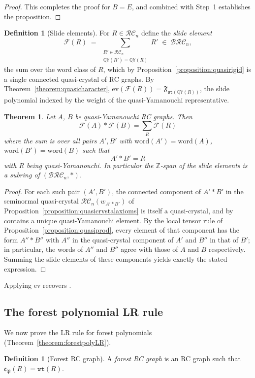 \documentclass{amsart}
\newtheorem{theorem}{Theorem}[section]
\theoremstyle{definition}
\newtheorem{definition}[lemma]{Definition}
\theoremstyle{remark}
\numberwithin{equation}{subsection}
\newcommand{\wof}[1]{w_{#1}}
\newcommand{\slel}{\mathcal{F}}
\newcommand{\wtt}{\mathtt{wt}}
\newcommand{\QY}{\ensuremath{\mathbb{QY}}}
\newcommand{\BRC}{\mathcal{BRC}}
\newcommand{\RC}{\mathcal{RC}}
\newcommand{\slide}{\mathfrak{F}}
\newcommand{\code}{\mathfrak{c}}
\newcommand{\forest}{\mathfrak{P}}
\begin{document}
\begin{proof}
This completes the proof for $B = E$, and combined with Step~1 establishes the proposition.
\end{proof}

\begin{definition}[Slide elements]\label{definition:slideelement}
For $R\in\RC_n$ define the \emph{slide element}
$$\slel(R)\;=\;\sum_{\substack{R'\in\RC_n\\ \QY(R')=\QY(R)}}R'\;\in\;\BRC_n,$$
the sum over the word class of $R$, which by Proposition~\ref{proposition:quasirigid} is a single connected quasi-crystal of RC graphs. By Theorem~\ref{theorem:quasicharacter}, $\mathrm{ev}(\slel(R))=\slide_{\wtt(\QY(R))}$, the slide polynomial indexed by the weight of the quasi-Yamanouchi representative.
\end{definition}

\begin{theorem} \label{theorem:slideproduct}
Let $A$, $B$ be quasi-Yamanouchi RC graphs. Then
$$\slel(A)*\slel(B) = \sum_{R} \slel(R)$$
where the sum is over all pairs $A',B'$ with $\mathrm{word}(A')=\mathrm{word}(A)$, $\mathrm{word}(B')=\mathrm{word}(B)$ such that 
$$A'*B'=R$$
with $R$ being quasi-Yamanouchi. In particular the $\mathbb{Z}$-span of the slide elements is a subring of $(\BRC_n,*)$.
\end{theorem}
\begin{proof}
For each such pair $(A',B')$, the connected component of $A'*B'$ in the seminormal quasi-crystal $\RC_n(\wof{A'*B'})$ of Proposition~\ref{proposition:quasicrystalaxioms} is itself a quasi-crystal, and by \cite[Proposition~4.6]{cain2023quasicrystals} contains a unique quasi-Yamanouchi element. By the local tensor rule of Proposition~\ref{proposition:quasiprod}, every element of that component has the form $A''*B''$ with $A''$ in the quasi-crystal component of $A'$ and $B''$ in that of $B'$; in particular, the words of $A''$ and $B''$ agree with those of $A$ and $B$ respectively. Summing the slide elements of these components yields exactly the stated expression.
\end{proof}

Applying $\mathrm{ev}$ recovers \cite[Theorem~5.11]{assaf2017slide}.

\subsection{The forest polynomial LR rule}\label{section:forestlrsub}

We now prove the LR rule for forest polynomials (Theorem~\ref{theorem:forestpolyLR}).
\begin{definition}[Forest RC graph]
A \emph{forest RC graph} is an RC graph such that $\code_\forest(R) = \wtt(R)$. 
\end{definition}
\end{document}
